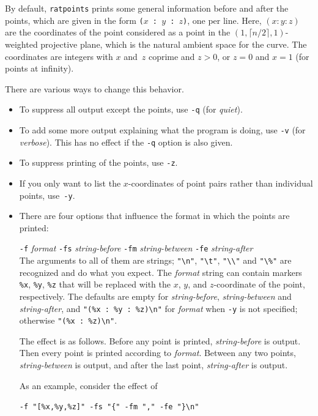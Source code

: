 \documentclass[12pt,a4paper,oneside]{amsart}
\begin{document}
By default, \texttt{ratpoints} prints some general information before and
after the points, which are given in the form
\verb+(+$x$\verb+ : +$y$\verb+ : +$z$\verb+)+, one per line.
Here, $(x : y : z)$ are the coordinates of the point considered as a point
in the $(1, \lceil n/2\rceil, 1)$-weighted projective plane, which is the
natural ambient space for the curve. The coordinates are integers with
$x$ and~$z$ coprime and $z > 0$, or $z = 0$ and $x = 1$ (for points at
infinity).

There are various ways to change this behavior.
\begin{itemize}\setlength{\parindent}{0mm}\setlength{\parskip}{1ex}
  \item To suppress all output except the points, use \verb+-q+ (for
        {\em quiet}).
  \item To add some more output explaining what the program is doing,
        use \verb+-v+ (for {\em verbose}). This has no effect if
        the \verb+-q+ option is also given.
  \item To suppress printing of the points, use \verb+-z+.
  \item If you only want to list the $x$-coordinates of point pairs rather
        than individual points, use~\verb+-y+.
  \item There are four options that influence the format in which the
        points are printed: \\
        \strut\quad \verb+-f+ {\em format} \verb+-fs+ {\em string-before}
        \verb+-fm+ {\em string-between} \verb+-fe+ {\em string-after} \\
        The arguments to all of them are strings; \verb+"\n"+, \verb+"\t"+,
        \verb+"\\"+ and \verb+"\%"+ are recognized and do what you expect.
        The {\em format} string can contain markers \verb+%x+, \verb+%y+,
        \verb+%z+ that will be replaced with the $x$, $y$, and $z$-coordinate
        of the point, respectively. The defaults are empty for
        {\em string-before}, {\em string-between} and {\em string-after},
        and \verb+"(%x : %y : %z)\n"+ for {\em format} when \verb+-y+
        is not specified; otherwise \verb+"(%x : %z)\n"+.

        The effect is as follows. Before any point is printed,
        {\em string-before} is output. Then every point is printed
        according to {\em format}. Between any two points, {\em string-between}
        is output, and after the last point, {\em string-after} is output.

        As an example, consider the effect of \\
        \strut\quad\verb+-f "[%x,%y,%z]" -fs "{" -fm "," -fe "}\n"+
\end{itemize}
\end{document}
